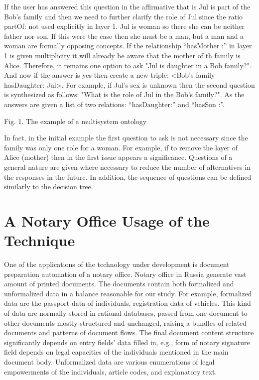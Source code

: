 \documentclass[conference]{IEEEtran}
\begin{document}
	If the user has answered this question in the affirmative  that is Jul is part of the Bob's family and then we need to further clarify the role of Jul since the ratio partOf: not used explicitly in layer 1. Jul is woman so there she can be neither father nor son. If this were the case then she must be a man, but a man and a woman are formally opposing concepts. If the relationship “hasMother :” in layer 1 is given multiplicity it will already be aware that the mother of th family is Alice. Therefore, it remains one option to ask "Jul is daughter in a Bob family?". And now if the answer is yes then create a new triple: <Bob's family hasDaughter: Jul>. For example, if Jul's sex is unknown then the second question is synthesized as follows: "What is the role of Jul in the Bob's family?". As the answers are given a list of two relations: “hasDaughter:” and “hasSon :”.

Fig. 1. The example of a multisystem ontology

	In fact, in the initial example the first question to ask is not necessary since the family was only one role for a woman. For example, if to remove the layer of Alice (mother) then in the first issue appears a significance. Questions of a general nature are given where necessary to reduce the number of alternatives in the responses in the future. In addition, the sequence of questions can be defined similarly to the decision tree.


\section{A Notary Office Usage of the Technique}

One of the applications of the technology under development is
document preparation automation of a notary office.  Notary office in
Russia generate vast amount of printed documents.  The documents
contain both formalized and unformalized data in a balance reasonable
for our study.  For example, formalized data are the passport data of
individuals, registration data of vehicles.  This kind of data are
normally stored in rational databases, passed from one document to
other documents mostly structured and unchanged, raising a bundles of
related documents and patterns of document flows.  The final document
content structure significantly depends on entry fields’ data filled
in, e.g., form of notary signature field depends on legal capacities of the
individuals mentioned in the main document body.
Unformalized data are various enumerations of legal empowerments of
the individuals, article codes, and explanatory text.
\end{document}
